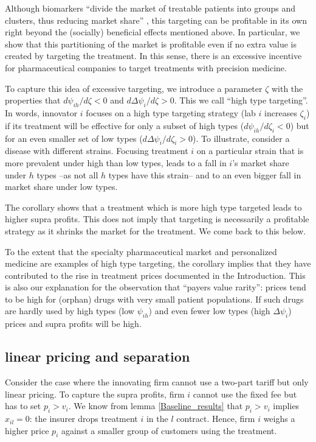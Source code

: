 \documentclass[a4paper,12pt]{article}
\begin{document}
Although biomarkers ``divide the market of treatable patients into groups and clusters, thus reducing market share'' \citep{jakka13_econom_persp_person_medic}, this targeting can be profitable in its own right beyond the (socially) beneficial effects mentioned above. In particular, we show that this partitioning of the market is profitable even if no extra value is created by targeting the treatment. In this sense, there is an excessive incentive for pharmaceutical companies to target treatments with precision medicine.

To capture this idea of excessive targeting, we introduce a parameter \(\zeta\) with the properties that \(d\psi_{ih}/d\zeta <0\) and \(d\Delta \psi_i/d\zeta>0\). This we call ``high type targeting''. In words, innovator \(i\) focuses on a high type targeting strategy (lab \(i\) increases \(\zeta_i\)) if its treatment will be effective for only a subset of high types (\(d\psi_{ih}/d\zeta_i <0\)) but for an even smaller set of low types (\(d\Delta\psi_i/d\zeta_i>0\)). To illustrate, consider a disease with different strains. Focusing treatment \(i\) on a particular strain that is more prevalent under high than low types, leads to a fall in \(i\)'s market share under \(h\) types --as not all \(h\) types have this strain-- and to an even bigger fall in market share under low types.

The corollary shows that a treatment which is more high type targeted leads to higher supra profits. This does not imply that targeting is necessarily a profitable strategy as it shrinks the market for the treatment. We come back to this below.

To the extent that the specialty pharmaceutical market and  personalized medicine are examples of high type targeting, the corollary implies that they have contributed to the rise in treatment prices documented in the Introduction. This is also our explanation for the observation that ``payers value rarity'': prices tend to be high for (orphan) drugs with very small patient populations. If such drugs are hardly used by high types (low \(\psi_{ih}\)) and even fewer low types (high \(\Delta \psi_i\)) prices and supra profits will be high.

\subsection{linear pricing and separation}
\label{sec:orgcddc221}

Consider the case where the innovating firm cannot use a two-part tariff but only linear pricing. To capture the supra profits, firm \(i\) cannot use the fixed fee but has to set \(p_i > v_i\). We know from lemma \ref{Baseline_results} that \(p_i>v_i\) implies \(x_{il}=0\): the insurer drops treatment \(i\) in the \(l\) contract. Hence, firm \(i\) weighs a higher price \(p_i\) against a smaller group of customers using the treatment.
\end{document}

